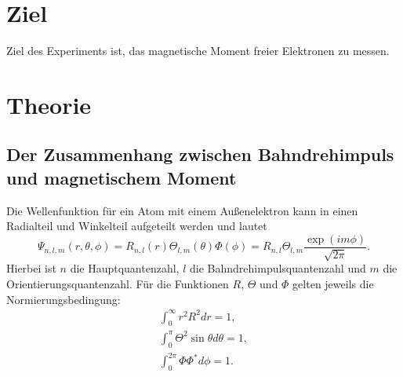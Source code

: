 \section{Ziel}
Ziel des Experiments ist, das magnetische Moment freier Elektronen zu messen.

\section{Theorie}
\subsection{Der Zusammenhang zwischen Bahndrehimpuls und magnetischem Moment}
Die Wellenfunktion für ein Atom mit einem Außenelektron kann in einen Radialteil und Winkelteil aufgeteilt werden und lautet
\begin{equation*}
  \Psi_{n,l,m}(r,\theta,\phi) = R_{n,l}(r)\Theta_{l,m}(\theta)\Phi(\phi) = R_{n,l}\Theta_{l,m}\frac{\exp(im\phi)}{\sqrt{2\pi}}.
\end{equation*}
Hierbei ist $n$ die Hauptquantenzahl, $l$ die Bahndrehimpulsquantenzahl und $m$ die Orientierungsquantenzahl.
Für die Funktionen $R$, $\Theta$ und $\Phi$ gelten jeweils die Normierungsbedingung:
\begin{gather*}
  \int_0^{\infty}r^2R^2dr = 1, \\
  \int_0^{\pi}\Theta^2\sin{\theta}d\theta = 1, \\
  \int_0^{2\pi}\Phi\Phi^*d\phi = 1.
\end{gather*}
